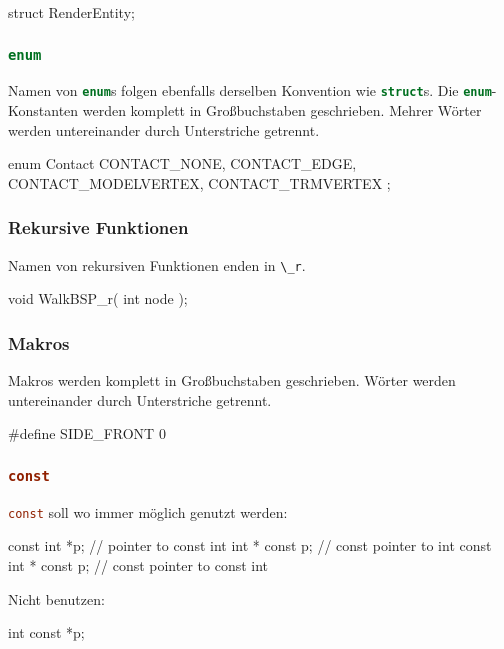 \documentclass{homework-pp}
\renewcommand{\c}[1]{\lstinline[language=c,basicstyle=\ttfamily]|#1|}
\begin{document}
\begin{cblock}
struct RenderEntity;
\end{cblock}

\subsubsection{\c{enum}}
Namen von \c{enum}s folgen ebenfalls derselben Konvention wie \c{struct}s. Die \c{enum}-Konstanten werden komplett in Großbuchstaben geschrieben. Mehrer Wörter werden untereinander durch Unterstriche getrennt.

\begin{cblock}
enum Contact {
	CONTACT_NONE,
	CONTACT_EDGE,
	CONTACT_MODELVERTEX,
	CONTACT_TRMVERTEX
};
\end{cblock}

\subsubsection{Rekursive Funktionen}

Namen von rekursiven Funktionen enden in \c{\_r}.

\begin{cblock}
void WalkBSP_r( int node );
\end{cblock}

\subsubsection{Makros}

Makros werden komplett in Großbuchstaben geschrieben. Wörter werden untereinander durch Unterstriche getrennt.

\begin{cblock}
#define SIDE_FRONT 0
\end{cblock}

\subsubsection{\c{const}}

\c{const} soll wo immer möglich genutzt werden:

\begin{cblock}
const int *p; // pointer to const int
int * const p; // const pointer to int
const int * const p; // const pointer to const int
\end{cblock}

Nicht benutzen:

\begin{cblock}
int const *p;
\end{cblock}
\end{document}
